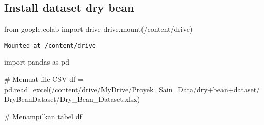 \documentclass[
  letterpaper,
]{krantz}
\makeatletter
\newenvironment{Shaded}{\begin{snugshade}}{\end{snugshade}}
\newcommand{\CommentTok}[1]{\textcolor[rgb]{0.37,0.37,0.37}{#1}}
\newcommand{\ImportTok}[1]{\textcolor[rgb]{0.00,0.46,0.62}{#1}}
\newcommand{\NormalTok}[1]{\textcolor[rgb]{0.00,0.23,0.31}{#1}}
\newcommand{\OperatorTok}[1]{\textcolor[rgb]{0.37,0.37,0.37}{#1}}
\newcommand{\StringTok}[1]{\textcolor[rgb]{0.13,0.47,0.30}{#1}}
\newenvironment{kframe}{%
\medskip{}
\setlength{\fboxsep}{.8em}
 \def\at@end@of@kframe{}%
 \ifinner\ifhmode%
  \def\at@end@of@kframe{\end{minipage}}%
  \begin{minipage}{\columnwidth}%
 \fi\fi%
 \def\FrameCommand##1{\hskip\@totalleftmargin \hskip-\fboxsep
 \colorbox{shadecolor}{##1}\hskip-\fboxsep
     \hskip-\linewidth \hskip-\@totalleftmargin \hskip\columnwidth}%
 \MakeFramed {\advance\hsize-\width
   \@totalleftmargin\z@ \linewidth\hsize
   \@setminipage}}%
 {\par\unskip\endMakeFramed%
 \at@end@of@kframe}
\renewenvironment{Shaded}{\begin{kframe}}{\end{kframe}}
\makeatother
\begin{document}
\hypertarget{install-dataset-dry-bean}{%
\subsection{Install dataset dry bean}\label{install-dataset-dry-bean}}

\begin{Shaded}
\begin{Highlighting}[]
\ImportTok{from}\NormalTok{ google.colab }\ImportTok{import}\NormalTok{ drive}
\NormalTok{drive.mount(}\StringTok{\textquotesingle{}/content/drive\textquotesingle{}}\NormalTok{)}
\end{Highlighting}
\end{Shaded}

\begin{verbatim}
Mounted at /content/drive
\end{verbatim}

\begin{Shaded}
\begin{Highlighting}[]
\ImportTok{import}\NormalTok{ pandas }\ImportTok{as}\NormalTok{ pd}

\CommentTok{\# Memuat file CSV}
\NormalTok{df }\OperatorTok{=}\NormalTok{ pd.read\_excel(}\StringTok{\textquotesingle{}/content/drive/MyDrive/Proyek\_Sain\_Data/dry+bean+dataset/DryBeanDataset/Dry\_Bean\_Dataset.xlsx\textquotesingle{}}\NormalTok{)}

\CommentTok{\# Menampilkan tabel}
\NormalTok{df}
\end{Highlighting}
\end{Shaded}
\end{document}

